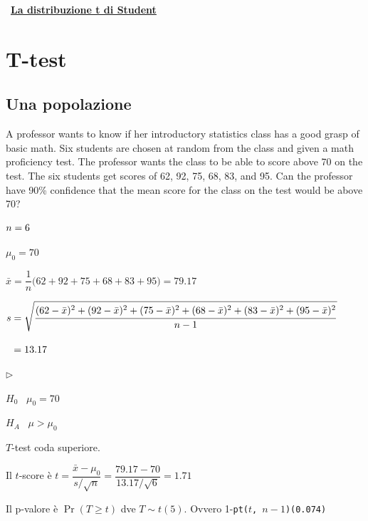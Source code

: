 \documentclass[11pt,openany]{book}
\newcommand{\mylabel}[1]{{\footnotesize\textsf{#1}}\hfill}
\renewenvironment{itemize}
  {\begin{list}{$\triangleright$}{%
   \setlength{\parskip}{0mm}
   \setlength{\topsep}{.2\baselineskip}
   \setlength{\rightmargin}{0mm}
   \setlength{\listparindent}{0mm}
   \setlength{\itemindent}{0mm}
   \setlength{\labelwidth}{3ex}
   \setlength{\itemsep}{.4\baselineskip}
   \setlength{\parsep}{0mm}
   \setlength{\partopsep}{0mm}
   \setlength{\labelsep}{1ex}
   \setlength{\leftmargin}{\labelwidth+\labelsep}
   \let\makelabel\mylabel}}{%
   \end{list}\vspace*{-1.3mm}}
\begin{document}
\clearpage\ 
\hfill\textbf{{\color{brown}\hyperref[tStudent]{La distribuzione t di Student \faShare}}}
\section{T-test}
\label{T-test}
\subsection{Una popolazione}
A professor wants to know if her introductory statistics class has a good grasp of basic math. Six students are chosen at random from the class and given a math proficiency test. The professor wants the class to be able to score above 70 on the test. The six students get scores of 62, 92, 75, 68, 83, and 95. Can the professor have 90\%  confidence that the mean score for the class on the test would be above 70?

$\strut n=6$

$\mu_0=70$

$\bar x =\dfrac1n\big(62+92+75+68+83+95\big) =79.17$

$s = \sqrt{\dfrac{\strut(62-\bar x)^2+(92-\bar x)^2+(75-\bar x)^2+(68-\bar x)^2+(83-\bar x)^2+(95-\bar x)^2}{n-1}}$

$\strut\phantom{s} = 13.17$

\begin{itemize}
\item[1.] $H_0$ \ $\mu_0 = 70$

\item[2.] $H_A$ \ $\mu>\mu_0$

\item[3.] $T$-test coda superiore. 

\item[4.] Il $t$-score è 
$t = \dfrac{\bar x - \mu_0}{s/\sqrt{n}}=\dfrac{79.17-70}{13.17/\sqrt{6}} = 1.71$

\item[5.] Il p-valore è $\Pr(T\ge t)$ dve $T\sim t(5)$. Ovvero 1-{\tt pt($t$, $n-1$)}\hfill{\tt (0.074)}
\end{itemize}


\end{document}
